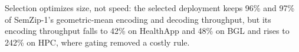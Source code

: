Selection optimizes size, not speed: the selected deployment keeps 96\% and 97\% of SemZip-1's geometric-mean encoding and decoding throughput, but its encoding throughput falls to 42\% on HealthApp and 48\% on BGL and rises to 242\% on HPC, where gating removed a costly rule.
